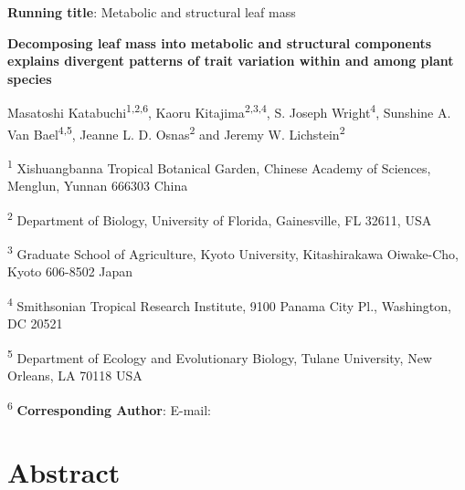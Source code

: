 \documentclass[
  12pt,
  a4paper,
,tablecaptionabove
]{scrartcl}
\date{}
\title{}
\author{}
\providecommand{\DIFaddtex}[1]{{\protect\color{blue}\uwave{#1}}} %
\providecommand{\DIFaddbegin}{} %
\providecommand{\DIFaddend}{} %
\providecommand{\DIFdelbegin}{} %
\providecommand{\DIFdelend}{} %
\providecommand{\DIFadd}[1]{\texorpdfstring{\DIFaddtex{#1}}{#1}} %
\newcommand{\DIFscaledelfig}{0.5}
\newlength{\DIFdelgraphicswidth} %
\newlength{\DIFdelgraphicsheight} %
\newcommand{\DIFaddincludegraphics}[2][]{{\color{blue}\fbox{\DIFOincludegraphics[#1]{#2}}}} %
\newcommand{\DIFdelincludegraphics}[2][]{%
\sbox{\DIFdelgraphicsbox}{\DIFOincludegraphics[#1]{#2}}%
\settoboxwidth{\DIFdelgraphicswidth}{\DIFdelgraphicsbox} %
\settoboxtotalheight{\DIFdelgraphicsheight}{\DIFdelgraphicsbox} %
\scalebox{\DIFscaledelfig}{%
\parbox[b]{\DIFdelgraphicswidth}{\usebox{\DIFdelgraphicsbox}\\[-\baselineskip] \rule{\DIFdelgraphicswidth}{0em}}\llap{\resizebox{\DIFdelgraphicswidth}{\DIFdelgraphicsheight}{%
\setlength{\unitlength}{\DIFdelgraphicswidth}%
\begin{picture}(1,1)%
\thicklines\linethickness{2pt} %
{\color[rgb]{1,0,0}\put(0,0){\framebox(1,1){}}}%
{\color[rgb]{1,0,0}\put(0,0){\line( 1,1){1}}}%
{\color[rgb]{1,0,0}\put(0,1){\line(1,-1){1}}}%
\end{picture}%
}\hspace*{3pt}}} %
} %
\DeclareRobustCommand{\DIFaddbegin}{\DIFOaddbegin \let\includegraphics\DIFaddincludegraphics} %
\DeclareRobustCommand{\DIFaddend}{\DIFOaddend \let\includegraphics\DIFOincludegraphics} %
\DeclareRobustCommand{\DIFdelbegin}{\DIFOdelbegin \let\includegraphics\DIFdelincludegraphics} %
\DeclareRobustCommand{\DIFdelend}{\DIFOaddend \let\includegraphics\DIFOincludegraphics} %
\begin{document}




\DIFaddbegin \ifdefined\Shaded\renewenvironment{Shaded}{\begin{tcolorbox}[borderline west={3pt}{0pt}{shadecolor}, breakable, boxrule=0pt, frame hidden, enhanced, interior hidden, sharp corners]}{\end{tcolorbox}}\fi

\DIFaddend \textbf{Running title}: Metabolic and structural leaf mass

\textbf{Decomposing leaf mass into metabolic and structural components
explains divergent patterns of trait variation within and among plant
species}

Masatoshi Katabuchi\textsuperscript{1,2,6}, Kaoru
Kitajima\textsuperscript{2,3,4}, S. Joseph Wright\textsuperscript{4},
Sunshine A. Van Bael\textsuperscript{4,5}, Jeanne L. D.
Osnas\textsuperscript{2} and Jeremy W. Lichstein\textsuperscript{2}

\textsuperscript{1} Xishuangbanna Tropical Botanical Garden, Chinese
Academy of Sciences, Menglun, Yunnan 666303 China

\textsuperscript{2} Department of Biology, University of Florida,
Gainesville, FL 32611, USA

\textsuperscript{3} Graduate School of Agriculture, Kyoto University,
Kitashirakawa Oiwake-Cho, Kyoto 606-8502 Japan

\textsuperscript{4} Smithsonian Tropical Research Institute, 9100 Panama
City Pl., Washington, DC 20521

\textsuperscript{5} Department of Ecology and Evolutionary Biology,
Tulane University, New Orleans, LA 70118 USA

\textsuperscript{6} \textbf{Corresponding Author}: E-mail:
\DIFdelbegin %
\DIFdelend \DIFaddbegin \DIFadd{mattocci27@gmail.com
}\DIFaddend

\newpage

\hypertarget{abstract}{%
\section{Abstract}\label{abstract}}
\end{document}
